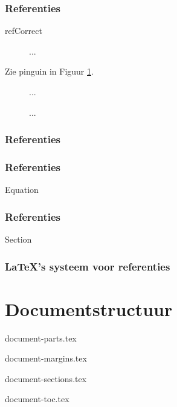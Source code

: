 \documentclass{cursuspresentatie}
\def\importslide#1#2{%
	{#2}
}
\begin{document}
\begin{frame}
	\frametitle{Referenties}

	\unless\ifishandout
	\fi

\end{frame}

\begin{saveblock}{refCorrect}
	\begin{highlightblock}[gobble=8,linewidth=\textwidth,
		framexleftmargin=0.25em,xleftmargin=0.25em]
		\begin{figure} %
			... %
		\end{figure}
		Zie pinguin in Figuur \ref{fig:pinguin}.
		\begin{figure} %
			... %
			\caption{...}\label{fig:pinguin}
		\end{figure}
	\end{highlightblock}
\end{saveblock}

\begin{frame}
	\frametitle{Referenties}

\end{frame}

\begin{frame}
	\frametitle{Referenties}

	Equation
\end{frame}

\begin{frame}
	\frametitle{Referenties}

	Section
\end{frame}

\begin{frame}
	\frametitle{\texorpdfstring{\LaTeX}{LaTeX}'s systeem voor referenties}


	
\end{frame}

\section{Documentstructuur}

\importslide{document}{document-parts.tex}

\importslide{document}{document-margins.tex}

\importslide{document}{document-sections.tex}

\importslide{document}{document-toc.tex}
\end{document}
